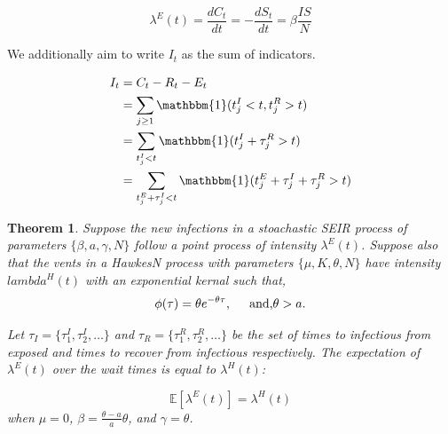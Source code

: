 \documentclass[12pt]{article}
\newtheorem{theorem}{Theorem}
\begin{document}
\begin{equation}
  \lambda^{E}(t) = \frac{d C_t}{dt} =  -\frac{dS_t}{dt} = \beta \frac{IS}{N}
\end{equation}

We additionally aim to write $I_t$ as the sum of indicators. 

\begin{align*}
  I_t &= C_t - R_t - E_t  \\
  &= \sum_{j \geq 1} \mathbbm{1} (t_j^I < t, t_j^R > t) \\
  &=  \sum_{t_j^I < t} \mathbbm{1} (t_j^I + \tau_j^R > t) \\
  &=  \sum_{t_j^E + \tau_j^I < t} \mathbbm{1} (t_j^E + \tau_j^I + \tau_j^R > t) 
\end{align*}



\begin{theorem}\label{thrm:SEIR}
  Suppose the new infections in a stoachastic SEIR process of parameters $\{\beta, a, \gamma, N\}$ follow a point process of intensity $\lambda^E(t)$. Suppose also that the vents in a HawkesN process with parameters $\{\mu, K, \theta, N\}$ have intensity $lambda^H(t)$ with an exponential kernal such that,
  \[
  \phi(\tau) = \theta e^{-\theta \tau}, \hspace{5mm} \text{and,} \theta > a.
  \]

  Let $\tau_I = \{\tau_1^I, \tau_2^I, \ldots\}$ and $\tau_R = \{\tau_1^R, \tau_2^R, \ldots\}$ be the set of times to infectious from exposed and times to recover from infectious respectively. The expectation of $\lambda^E(t)$ over the wait times is equal to $\lambda^H(t)$:


  \[
\mathbb{E}[\lambda^E(t)] = \lambda^H(t)
  \]
  when $\mu=0$, $\beta=\frac{\theta - a}{a} \theta$, and $\gamma = \theta$. 
\end{theorem}
\end{document}
